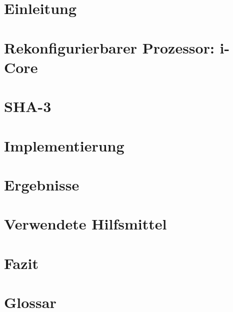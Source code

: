 \renewcommand{\chaptername}{Kapitel}

\chapter{Einleitung}


\chapter{Rekonfigurierbarer Prozessor: i-Core}
\label{cha:icore}


\chapter{SHA-3}
\label{cha:sha3}


\chapter{Implementierung}


\newpage

\newpage


\chapter{Ergebnisse}
\label{cha:ergebnisse}


\chapter{Verwendete Hilfsmittel}


\chapter{Fazit}


\chapter{Glossar}

